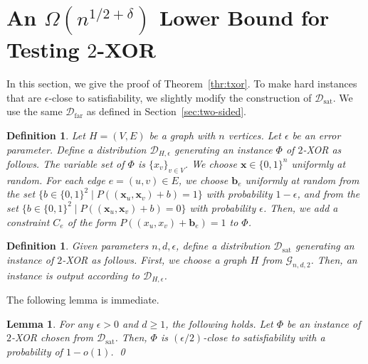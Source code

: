 \documentclass[letterpaper,11pt]{article}
\newtheorem{lemma}[theorem]{Lemma}
\newtheorem{definition}[theorem]{Definition}
\newcommand{\cald}{\mathcal{D}}
\newcommand{\caldsat}{\mathcal{D}_{\mathrm{sat}}}
\newcommand{\caldfar}{\mathcal{D}_{\mathrm{far}}}
\newcommand{\calg}{\mathcal{G}}
\newcommand{\bfx}{\mathbf{x}}
\newcommand{\bfb}{\mathbf{b}}
\newcommand{\bit}{\{0,1\}}
\newcommand{\txor}{\textsf{$2$-XOR}\xspace}
\begin{document}
\section{An $\Omega(n^{1/2+\delta})$ Lower Bound for Testing \txor}\label{apx:txor}
In this section, 
we give the proof of Theorem~\ref{thr:txor}.
To make hard instances that are $\epsilon$-close to satisfiability,
we slightly modify the construction of $\caldsat$.
We use the same $\caldfar$ as defined in Section~\ref{sec:two-sided}.
\begin{definition}
  Let $H=(V,E)$ be a graph with $n$ vertices.
  Let $\epsilon$ be an error parameter.
  Define a distribution $\cald_{H,\epsilon}$ generating an instance $\Phi$ of \txor as follows.
  The variable set of $\Phi$ is $\{x_v\}_{v\in V}$.
  We choose $\bfx\in \bit^n$ uniformly at random.
  For each edge $e=(u,v)\in E$, 
  we choose $\bfb_e$ uniformly at random from the set $\{b\in \bit^2\mid P((\bfx_{u},\bfx_{v})+b)=1 \}$ with probability $1-\epsilon$,
  and from the set $\{b\in \bit^2\mid P((\bfx_{u},\bfx_{v})+b)=0 \}$ with probability $\epsilon$.
  Then, we add a constraint $C_e$ of the form $P((x_{u},x_{v})+\bfb_e)=1$ to $\Phi$.
\end{definition}
\begin{definition}
  Given parameters $n,d,\epsilon$, 
  define a distribution ${\caldsat}$ generating an instance of \txor as follows.
  First, we choose a graph $H$ from $\calg_{n,d,2}$.
  Then, an instance is output according to $\cald_{H,\epsilon}$.
\end{definition}
The following lemma is immediate.
\begin{lemma}\label{lmm:close}
  For any $\epsilon>0$ and $d\geq 1$, the following holds.
  Let $\Phi$ be an instance of \txor chosen from $\caldsat$.
  Then, $\Phi$ is $(\epsilon/2)$-close to satisfiability with a probability of $1-o(1)$.
  \qed
\end{lemma}
\end{document}
